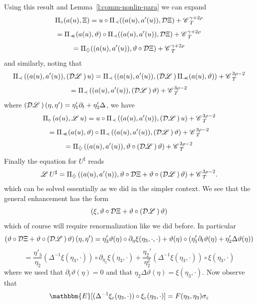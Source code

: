 \documentclass[11pt,reqno]{amsart}
\newcommand{\precprec}{\prec\!\!\!\prec}
\newcommand{\CC}{\mathscr{C} \hspace{.1em}}
\newcommand{\LL}{\mathscr{L} \hspace{.2em}}
\begin{document}
Using this result and Lemma~\ref{l:comm-nonlin-para} we can expand
\[ \Pi_{\circ} (a (u), \Xi) = u \circ \Pi_{\prec} ((a (u), a' (u)),
   \mathcal{D} \Xi) + \CC_T^{\gamma + 2 \rho} \]
\[ = \Pi_{\precprec} (a (u), \vartheta) \circ \Pi_{\prec} ((a (u), a' (u)),
   \mathcal{D} \Xi) + \CC_T^{\gamma + 2 \rho} \]
\[ = \Pi_{\diamondsuit} ((a (u), a' (u)), \vartheta \circ \mathcal{D} \Xi) +
   \CC_T^{\gamma + 2 \rho} \]
and similarly, noting that
\[ \Pi_{\prec} \left( (a (u), a' (u)), \left( \mathcal{D} \LL \right) u
   \right) = \Pi_{\prec} \left( (a (u), a' (u)), \left( \mathcal{D} \LL
   \right) \Pi_{\precprec} (a (u), \vartheta) \right) + \CC_T^{3 \rho - 2} \]
\[ = \Pi_{\prec} \left( (a (u), a' (u)), \left( \mathcal{D} \LL \right)
   \vartheta \right) + \CC_T^{3 \rho - 2} \]
where $\left( \mathcal{D} \LL \right) (\eta, \eta') = \eta'_1 \partial_t +
\eta_2' \Delta$, we have
\[ \Pi_{\circ} \left( a (u), \LL u \right) = u \circ \Pi_{\prec} \left( (a
   (u), a' (u)), \left( \mathcal{D} \LL \right) u \right) + \CC_T^{3 \rho - 2}
\]
\[ = \Pi_{\precprec} (a (u), \vartheta) \circ \Pi_{\prec} \left( (a (u), a'
   (u)), \left( \mathcal{D} \LL \right) \vartheta \right) + \CC_T^{3 \rho - 2}
\]
\[ = \Pi_{\diamondsuit} \left( (a (u), a' (u)), \vartheta \circ \left(
   \mathcal{D} \LL \right) \vartheta \right) + \CC_T^{3 \rho - 2} \]
Finally the equation for $U^{\sharp}$ reads
\[ \LL U^{\sharp} = \Pi_{\diamondsuit} \left( (a (u), a' (u)), \vartheta \circ
   \mathcal{D} \Xi + \vartheta \circ \left( \mathcal{D} \LL \right) \vartheta
   \right) + \CC_T^{3 \rho - 2} . \]
which can be solved essentially as we did in the simpler context. We see that
the general enhancement has the form
\[ \left( \xi, \vartheta \circ \mathcal{D} \Xi + \vartheta \circ \left(
   \mathcal{D} \LL \right) \vartheta \right) \]
which of course will require renormalization like we did before. In particular
\[ \left( \vartheta \circ \mathcal{D} \Xi + \vartheta \circ \left( \mathcal{D}
   \LL \right) \vartheta \right) (\eta, \eta') = \eta'_3 \vartheta (\eta)
   \circ \partial_{\eta} \xi (\eta_3, \cdot, \cdot) + \vartheta (\eta) \circ
   (\eta'_1 \partial_t \vartheta (\eta) + \eta_2' \Delta \vartheta (\eta)) \]
\[ = \frac{\eta'_3}{\eta_2} (\Delta^{- 1} \xi (\eta_3, \cdot)) \circ
   \partial_{\eta_3} \xi (\eta_3, \cdot) + \frac{\eta_2'}{\eta_2^2} (\Delta^{-
   1} \xi (\eta_3, \cdot)) \circ \xi (\eta_3, \cdot) \]
where we used that $\partial_t \vartheta (\eta) = 0$ and that $\eta_2 \Delta
\vartheta (\eta) = \xi (\eta_3, \cdot)$. Now observe that
\[ \mathbbm{E} [(\Delta^{- 1} \xi_{\varepsilon} (\eta_3, \cdot)) \circ
   \xi_{\varepsilon} (\eta_3, \cdot)] = F (\eta_3, \eta_3)
   \sigma_{\varepsilon} \]
\end{document}
